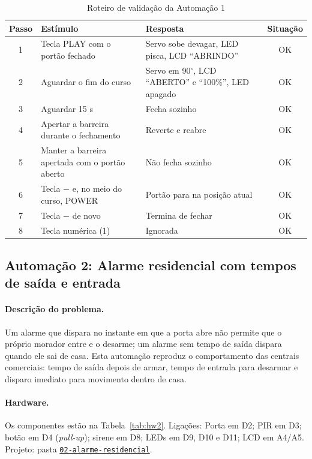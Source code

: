 \documentclass[12pt]{article}
\newcommand{\repositorio}{https://github.com/USUARIO/REPOSITORIO}
\newcommand{\pasta}[1]{\href{\repositorio/tree/main/#1}{\texttt{#1}}}
\begin{document}
\begin{table}[ht]
\centering
\caption{Roteiro de validação da Automação 1}\label{tab:val1}
\footnotesize
\begin{tabularx}{\textwidth}{cXXc}
\toprule
Passo & Estímulo & Resposta & Situação \\
\midrule
1 & Tecla PLAY com o portão fechado & Servo sobe devagar, LED pisca, LCD ``ABRINDO'' & OK \\
2 & Aguardar o fim do curso & Servo em 90$^\circ$, LCD ``ABERTO'' e ``100\%'', LED apagado & OK \\
3 & Aguardar 15 s & Fecha sozinho & OK \\
4 & Apertar a barreira durante o fechamento & Reverte e reabre & OK \\
5 & Manter a barreira apertada com o portão aberto & Não fecha sozinho & OK \\
6 & Tecla $-$ e, no meio do curso, POWER & Portão para na posição atual & OK \\
7 & Tecla $-$ de novo & Termina de fechar & OK \\
8 & Tecla numérica (1) & Ignorada & OK \\
\bottomrule
\end{tabularx}
\end{table}

\subsection{Automação 2: Alarme residencial com tempos de saída e entrada}\label{sub:a2}

\paragraph{Descrição do problema.} Um alarme que dispara no instante em que a porta abre não permite que o próprio morador entre e o desarme; um alarme sem tempo de saída dispara quando ele sai de casa. Esta automação reproduz o comportamento das centrais comerciais: tempo de saída depois de armar, tempo de entrada para desarmar e disparo imediato para movimento dentro de casa.

\paragraph{Hardware.} Os componentes estão na Tabela~\ref{tab:hw2}. Ligações: Porta em D2; PIR em D3; botão em D4 (\emph{pull-up}); sirene em D8; LEDs em D9, D10 e D11; LCD em A4/A5. Projeto: pasta \pasta{02-alarme-residencial}.
\end{document}
